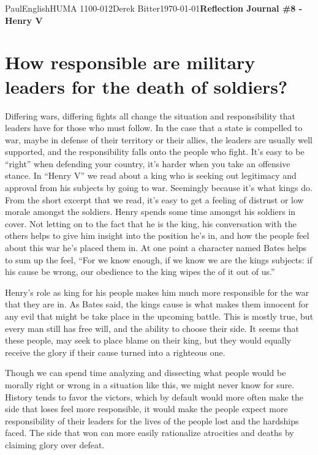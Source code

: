\documentclass[12pt,letterpaper]{article}
\begin{document}
\begin{mla}{Paul}{English}{HUMA 1100-012}{Derek
    Bitter}{\today}{\textbf{Reflection Journal \#8 - Henry V}}

\section*{How responsible are military leaders for the death of soldiers?}

Differing wars, differing fights all change the situation and responsibility that leaders have for those who must follow. In the case that a state is compelled to war, maybe in defense of their territory or their allies, the leaders are usually well supported, and the responsibility falls onto the people who fight. It's easy to be ``right'' when defending your country, it's harder when you take an offensive stance. In ``Henry V'' we read about a king who is seeking out legitimacy and approval from his subjects by going to war. Seemingly because it's what kings do. From the short excerpt that we read, it's easy to get a feeling of distrust or low morale amongst the soldiers. Henry spends some time amongst his soldiers in cover. Not letting on to the fact that he is the king, his conversation with the others helps to give him insight into the position he's in, and how the people feel about this war he's placed them in. At one point a character named Bates helps to sum up the feel, ``For we know enough, if we know we are the kings subjects: if his cause be wrong, our obedience to the king wipes the of it out of us.''

Henry's role as king for his people makes him much more responsible for the war that they are in. As Bates said, the kings cause is what makes them innocent for any evil that might be take place in the upcoming battle. This is mostly true, but every man still has free will, and the ability to choose their side. It seems that these people, may seek to place blame on their king, but they would equally receive the glory if their cause turned into a righteous one.

Though we can spend time analyzing and dissecting what people would be morally right or wrong in a situation like this, we might never know for sure. History tends to favor the victors, which by default would more often make the side that loses feel more responsible, it would make the people expect more responsibility of their leaders for the lives of the people lost and the hardships faced. The side that won can more easily rationalize atrocities and deaths by claiming glory over defeat.



\end{mla}
\end{document}
